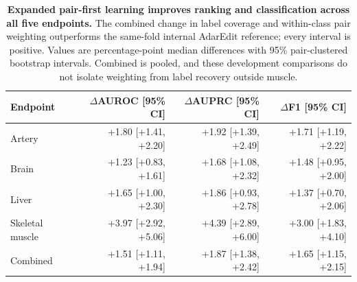 \begin{table}[H]
\centering
\caption{\textbf{Expanded pair-first learning improves ranking and classification across all five endpoints.} The combined change in label coverage and within-class pair weighting outperforms the same-fold internal AdarEdit reference; every interval is positive. Values are percentage-point median differences with 95\% pair-clustered bootstrap intervals. Combined is pooled, and these development comparisons do not isolate weighting from label recovery outside muscle.}\label{tab:pairbalance}
\begin{tabular}{lrrr}
\toprule
Endpoint & $\Delta$AUROC [95\% CI] & $\Delta$AUPRC [95\% CI] & $\Delta$F1 [95\% CI] \\
\midrule
Artery & +1.80 [+1.41, +2.20] & +1.92 [+1.39, +2.49] & +1.71 [+1.19, +2.22] \\
Brain & +1.23 [+0.83, +1.61] & +1.68 [+1.08, +2.32] & +1.48 [+0.95, +2.00] \\
Liver & +1.65 [+1.00, +2.30] & +1.86 [+0.93, +2.78] & +1.37 [+0.70, +2.06] \\
Skeletal muscle & +3.97 [+2.92, +5.06] & +4.39 [+2.89, +6.00] & +3.00 [+1.83, +4.10] \\
Combined & +1.51 [+1.11, +1.94] & +1.87 [+1.38, +2.42] & +1.65 [+1.15, +2.15] \\
\bottomrule
\end{tabular}
\end{table}
